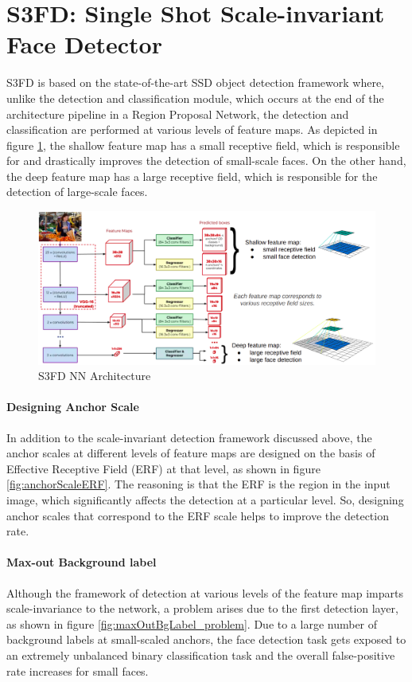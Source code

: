 \section{S3FD: Single Shot Scale-invariant Face Detector}
S3FD is based on the state-of-the-art SSD object detection framework \cite{ssd2016} where, unlike the detection and classification module, which occurs at the end of the architecture pipeline in a Region Proposal Network, the detection and classification are performed at various levels of feature maps. As depicted in figure \ref{fig:s3fdNN}, the shallow feature map has a small receptive field, which is responsible for and drastically improves the detection of small-scale faces. On the other hand, the deep feature map has a large receptive field, which is responsible for the detection of large-scale faces. 

\begin{figure}[h]
  \centering
    \includegraphics[width=1.0\textwidth]{LiteratureSurvey/S3FD_NN}
    \caption[S3FD]{S3FD NN Architecture}
    \label{fig:s3fdNN} 
\end{figure}

\paragraph{Designing Anchor Scale}
In addition to the scale-invariant detection framework discussed above, the anchor scales at different levels of feature maps are designed on the basis of Effective Receptive Field (ERF) at that level, as shown in figure \ref{fig:anchorScaleERF}. The reasoning is that the ERF is the region in the input image, which significantly affects the detection at a particular level. So, designing anchor scales that correspond to the ERF scale helps to improve the detection rate. 

\paragraph{Max-out Background label}
Although the framework of detection at various levels of the feature map imparts scale-invariance to the network, a problem arises due to the first detection layer, as shown in figure \ref{fig:maxOutBgLabel_problem}. Due to a large number of background labels at small-scaled anchors, the face detection task gets exposed to an extremely unbalanced binary classification task and the overall false-positive rate increases for small faces.

